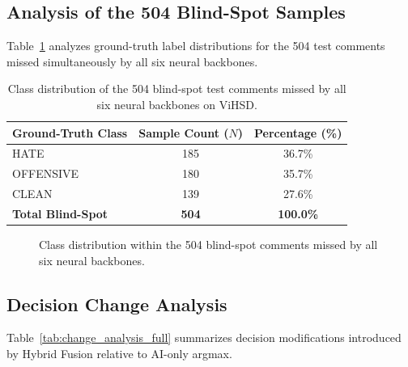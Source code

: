 \documentclass[runningheads]{llncs}
\begin{document}
\subsection{Analysis of the 504 Blind-Spot Samples}
Table~\ref{tab:blind_spot_full} analyzes ground-truth label distributions for the 504 test comments missed simultaneously by all six neural backbones.

\begin{table}[H]
\centering
\caption{Class distribution of the 504 blind-spot test comments missed by all six neural backbones on ViHSD.}
\label{tab:blind_spot_full}
\begin{tabular}{lcc}
\toprule
Ground-Truth Class & Sample Count ($N$) & Percentage (\%) \\
\midrule
HATE & 185 & 36.7\% \\
OFFENSIVE & 180 & 35.7\% \\
CLEAN & 139 & 27.6\% \\
\midrule
\textbf{Total Blind-Spot} & \textbf{504} & \textbf{100.0\%} \\
\bottomrule
\end{tabular}
\end{table}

\begin{figure}[H]
\centering
{}
\caption{Class distribution within the 504 blind-spot comments missed by all six neural backbones.}
\label{fig:blind_spot_dist}
\end{figure}

\subsection{Decision Change Analysis}
Table~\ref{tab:change_analysis_full} summarizes decision modifications introduced by Hybrid Fusion relative to AI-only argmax.
\end{document}
